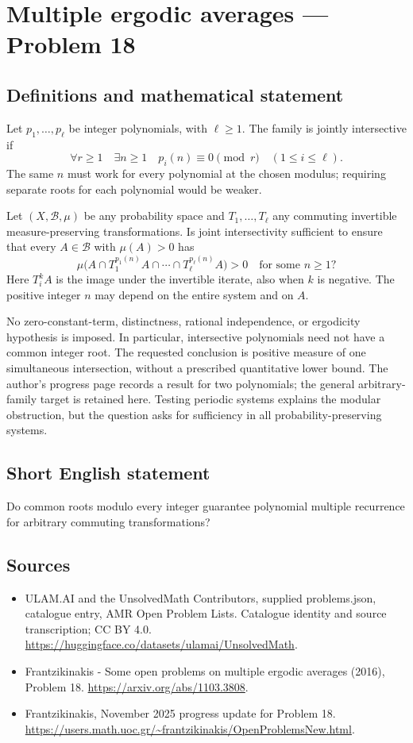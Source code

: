 \documentclass[11pt,a4paper]{article}
\begin{document}
\section*{Multiple ergodic averages — Problem 18}\label{statement}

\subsection{Definitions and mathematical statement}
Let $p_1,\ldots,p_\ell$ be integer polynomials, with
$\ell\ge1$. The family is jointly intersective if
\[
       \forall r\ge1\quad\exists n\ge1\quad
                p_i(n)\equiv0\pmod r\quad(1\le i\le\ell).
\]
The same $n$ must work for every polynomial at the
chosen modulus; requiring separate roots for each
polynomial would be weaker.

Let $(X,\mathcal B,\mu)$ be any probability space and
$T_1,\ldots,T_\ell$ any commuting invertible
measure-preserving transformations. Is joint
intersectivity sufficient to ensure that every
$A\in\mathcal B$ with $\mu(A)>0$ has
\[
           \mu\bigl(A\cap T_1^{p_1(n)}A\cap\cdots
                            \cap T_\ell^{p_\ell(n)}A\bigr)>0
                   \quad\text{for some }n\ge1?
\]
Here $T_i^kA$ is the image under the invertible
iterate, also when $k$ is negative. The positive
integer $n$ may depend on the entire system and
on $A$.

No zero-constant-term, distinctness, rational
independence, or ergodicity hypothesis is imposed.
In particular, intersective polynomials need not
have a common integer root. The requested conclusion
is positive measure of one simultaneous intersection,
without a prescribed quantitative lower bound.
The author's progress page records a result for two
polynomials; the general arbitrary-family target is
retained here. Testing periodic systems explains
the modular obstruction, but the question asks for
sufficiency in all probability-preserving systems.
\subsection{Short English statement}
Do common roots modulo every integer guarantee polynomial multiple recurrence for arbitrary commuting transformations?
\subsection{Sources}
\begin{itemize}
\item[S1] ULAM.AI and the UnsolvedMath Contributors, supplied problems.json, catalogue entry, AMR Open Problem Lists. Catalogue identity and source transcription; CC BY 4.0.
\url{https://huggingface.co/datasets/ulamai/UnsolvedMath}.
\item[S2] Frantzikinakis - Some open problems on multiple ergodic averages (2016), Problem 18. 
\url{https://arxiv.org/abs/1103.3808}.
\item[S3] Frantzikinakis, November 2025 progress update for Problem 18.
\url{https://users.math.uoc.gr/~frantzikinakis/OpenProblemsNew.html}.
\end{itemize}
\end{document}
